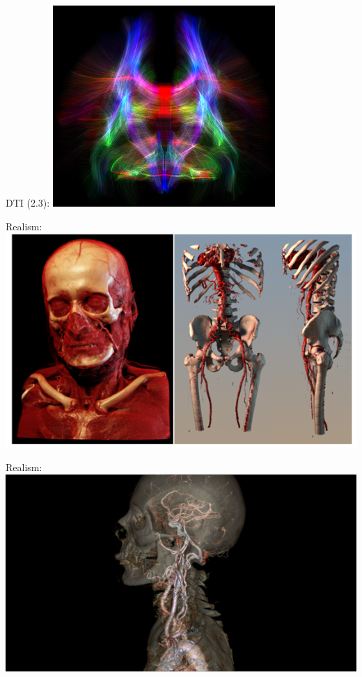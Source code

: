 \documentclass{beamer}
\begin{document}
\begin{frame}
	DTI (2.3):
	\includegraphics[width=\textwidth]{images/tractography}
\end{frame}

\begin{frame}
	Realism:
	\includegraphics[width=\textwidth]{images/medical_visualisation}
\end{frame}

\begin{frame}
	Realism:
	\includegraphics[width=\textwidth]{images/realistic_transparent}
\end{frame}
\end{document}
